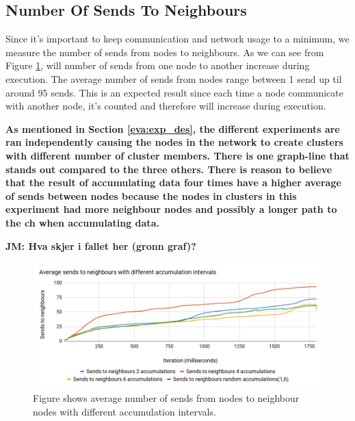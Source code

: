 \documentclass[USenglish]{uit-thesis}
\begin{document}
\newpage 

\subsection{Number Of Sends To Neighbours}
Since it's important to keep communication and network usage to a minimum, we measure the number of sends from nodes to neighbours. 
As we can see from Figure \ref{fig:sendsChart}, will number of sends from one node to another increase during execution. The average number of sends from nodes range between 1 send up til around 95 sends. This is an expected result since each time a node communicate with another node, it's counted and therefore will increase during execution.

\textbf{As mentioned in Section \ref{eva:exp_des}, the different experiments are ran independently causing the nodes in the network to create clusters with different number of cluster members. There is one graph-line that stands out compared to the three others. There is reason to believe that the result of accumulating data four times have a higher average of sends between nodes because the nodes in clusters in this experiment had more neighbour nodes and possibly a longer path to the \gls{ch} when accumulating data.}

\textbf{JM: Hva skjer i fallet her (gronn graf)?}

\begin{figure} [ht]
\centering
\includegraphics[width=\textwidth]{sendsChart.png}
\caption{Figure shows average number of sends from nodes to neighbour nodes with different accumulation intervals.}
\label{fig:sendsChart}
\end{figure}


\newpage
\end{document}
